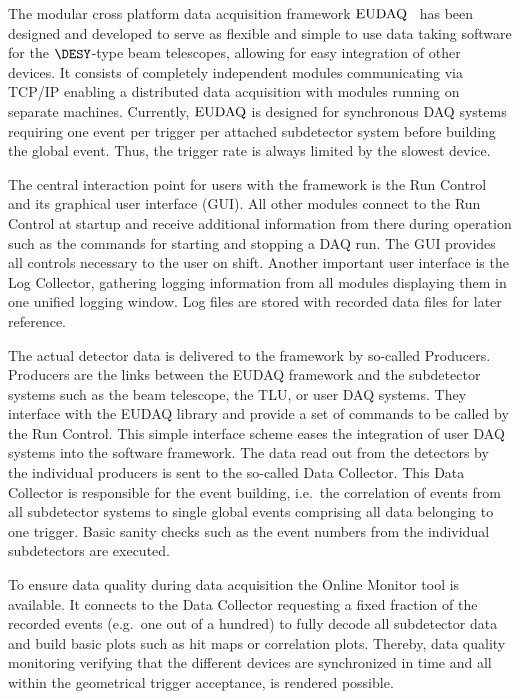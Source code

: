 
The modular cross platform data acquisition framework $\textrm{EUDAQ}$~\cite{ref:eudaqwebsite} has been designed and developed to serve as flexible and simple to use data taking software for the $\DESY$-type beam telescopes,
 allowing for easy integration of other devices. 
It consists of completely independent modules communicating via TCP/IP enabling a distributed data acquisition with modules running on separate machines. 
Currently, $\textrm{EUDAQ}$ is designed for synchronous DAQ systems requiring one event per trigger per attached subdetector system before building the global event. 
Thus, the trigger rate is always limited by the slowest device.

The central interaction point for users with the framework is the Run Control and its graphical user interface (GUI). 
All other modules connect to the Run Control at startup and receive additional information from there during operation such as the commands for starting and stopping a DAQ run. 
The GUI provides all controls necessary to the user on shift. 
Another important user interface is the Log Collector, gathering logging information from all modules displaying them in one unified logging window. 
Log files are stored with recorded data files for later reference.

The actual detector data is delivered to the framework by so-called Producers.
Producers are the links between the EUDAQ framework and the subdetector systems such as the beam telescope, the TLU, or user DAQ systems.
They interface with the EUDAQ library and provide a set of commands to be called by the Run Control. 
This simple interface scheme eases the integration of user DAQ systems into the software framework.
The data read out from the detectors by the individual producers is sent to the so-called Data Collector. 
This Data Collector is responsible for the event building, i.e.\ the correlation of events from all subdetector systems to single global events comprising all data belonging to one trigger. 
Basic sanity checks such as the event numbers from the individual subdetectors are executed.

To ensure data quality during data acquisition the Online Monitor tool is available. 
It connects to the Data Collector requesting a fixed fraction of the recorded events (e.g.\ one out of a hundred) to fully decode all subdetector data
 and build basic plots such as hit maps or correlation plots.
Thereby, data quality monitoring verifying that the different devices are synchronized in time and all within the geometrical trigger acceptance, is rendered possible.

